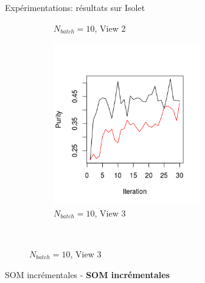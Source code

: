 \documentclass[hyperref={pdfpagelabels=false}]{beamer}
\begin{document}
\begin{frame}{Expérimentations: résultats sur Isolet}
\begin{figure}[!h]
\begin{subfigure}[b]{0.3\textwidth}
                    \caption{$N_{batch}=10$, View 2}
                \end{subfigure}
                \begin{subfigure}[b]{0.3\textwidth}
                    \centering
                    \includegraphics[width=0.7\textwidth, trim= 0cm 0.5cm 1cm 2cm, clip]{img/33.png}
                    \caption{$N_{batch}=10$, View 3}
                \end{subfigure}\\
            \end{figure}
            \begin{center}
                {\color{red}SOM incrémentales} - \textbf{SOM incrémentales
}
\end{center}
\end{frame}
\end{document}
